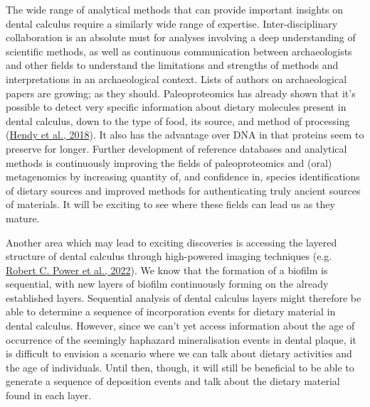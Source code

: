 \documentclass[
  letterpaper,
]{book}
\begin{document}
The wide range of analytical methods that can provide important insights
on dental calculus require a similarly wide range of expertise.
Inter-disciplinary collaboration is an absolute must for analyses
involving a deep understanding of scientific methods, as well as
continuous communication between archaeologists and other fields to
understand the limitations and strengths of methods and interpretations
in an archaeological context. Lists of authors on archaeological papers
are growing; as they should. Paleoproteomics has already shown that it's
possible to detect very specific information about dietary molecules
present in dental calculus, down to the type of food, its source, and
method of processing
(\protect\hyperlink{ref-hendyProteomicCalculus2018}{Hendy et al.,
2018}). It also has the advantage over DNA in that proteins seem to
preserve for longer. Further development of reference databases and
analytical methods is continuously improving the fields of
paleoproteomics and (oral) metagenomics by increasing quantity of, and
confidence in, species identifications of dietary sources and improved
methods for authenticating truly ancient sources of materials. It will
be exciting to see where these fields can lead us as they mature.

Another area which may lead to exciting discoveries is accessing the
layered structure of dental calculus through high-powered imaging
techniques (e.g.
\protect\hyperlink{ref-powerSynchrotronRadiationbased2022}{Robert C.
Power et al., 2022}). We know that the formation of a biofilm is
sequential, with new layers of biofilm continuously forming on the
already established layers. Sequential analysis of dental calculus
layers might therefore be able to determine a sequence of incorporation
events for dietary material in dental calculus. However, since we can't
yet access information about the age of occurrence of the seemingly
haphazard mineralisation events in dental plaque, it is difficult to
envision a scenario where we can talk about dietary activities and the
age of individuals. Until then, though, it will still be beneficial to
be able to generate a sequence of deposition events and talk about the
dietary material found in each layer.
\end{document}
